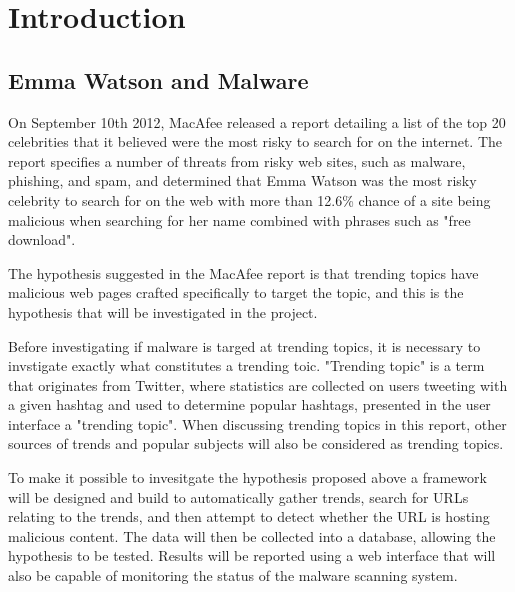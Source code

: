 \section{Introduction}

\subsection{Emma Watson and Malware}
On September 10th 2012, MacAfee released a report detailing a list of the top 20
celebrities that it believed were the most risky to search for on the internet\cite{mac-watson}.
The report specifies a number of threats from risky web sites, such as malware,
phishing, and spam, and determined that Emma Watson was the most risky celebrity
to search for on the web with more than 12.6\% chance of a site being malicious
when searching for her name combined with phrases such as "free download".

The hypothesis suggested in the MacAfee report is that trending topics have
malicious web pages crafted specifically to target the topic, and this is the
hypothesis that will be investigated in the project.

Before investigating if malware is targed at trending topics, it is necessary to
invstigate exactly what constitutes a trending toic. "Trending topic" is a term
that originates from Twitter, where statistics are collected on users tweeting
with a given hashtag and used to determine popular hashtags, presented in the
user interface a "trending topic". When discussing trending topics in this
report, other sources of trends and popular subjects will also be considered as
trending topics.

To make it possible to invesitgate the hypothesis proposed above a framework
will be designed and build to automatically gather trends, search for URLs
relating to the trends, and then attempt to detect whether the URL is hosting
malicious content. The data will then be collected into a database, allowing the
hypothesis to be tested. Results will be reported using a web interface that
will also be capable of monitoring the status of the malware scanning system.


